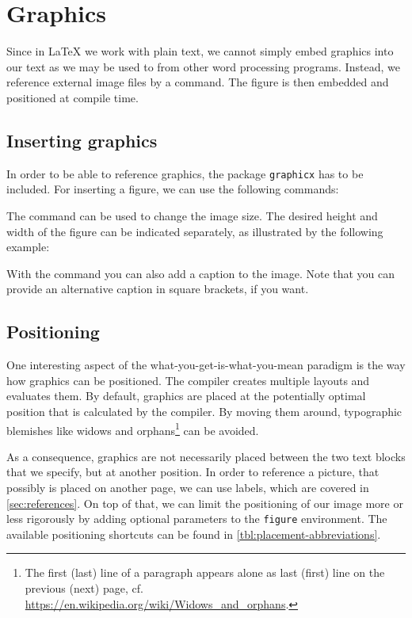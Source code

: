 \chapter{Graphics}
\label{sec:graphics}

Since in \LaTeX{} we work with plain text, we cannot simply embed graphics into our text as we may be used to from other word processing programs. 
Instead, we reference external image files by a command. The figure is then embedded and positioned at compile time.

\section{Inserting graphics}
\label{sec:display-graphics}
In order to be able to reference graphics, the package \texttt{graphicx} has to be included. For inserting a figure, we can use the following commands:


\noindent The command  can be used to change the image size. The desired height and width of the figure can be indicated separately, as illustrated by the following example:


With the  command you can also add a caption to the image. Note that you can provide an alternative caption in square brackets, if you want. 

\section{Positioning}
\label{sec:graphics-placement}
One interesting aspect of the  what-you-get-is-what-you-mean paradigm is the way how graphics can be positioned. 
The compiler creates multiple layouts and evaluates them. 
By default, graphics are placed at the potentially optimal position that is calculated by the compiler.
By moving them around, typographic blemishes like widows and orphans\footnote{The first (last) line of a paragraph appears alone as last (first) line on the previous (next) page, cf. \url{https://en.wikipedia.org/wiki/Widows_and_orphans}.} can be avoided. 

As a consequence, graphics are not necessarily placed between the two text blocks that we specify, but at another position. 
In order to reference a picture, that possibly is placed on another page, we can use labels, which are covered in \cref{sec:references}. 
On top of that, we can limit the positioning of our image more or less rigorously by adding optional parameters to the \texttt{figure} environment. The available positioning shortcuts can be found in \cref{tbl:placement-abbreviations}.

